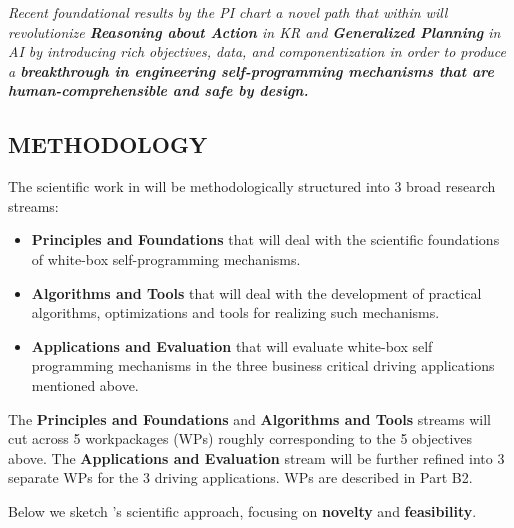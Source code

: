 \begin{framed}\it
Recent  foundational results by the PI chart a novel path that within \project will revolutionize \textbf{Reasoning about Action}  in KR and \textbf{Generalized Planning} in AI by introducing rich objectives, data, and componentization in order to produce a \textbf{breakthrough in engineering self-programming mechanisms that are human-comprehensible and safe by design.}
\end{framed}

\vspace{-3ex}
\subsection*{METHODOLOGY}
\vspace{-3ex}

The scientific work in \project will be methodologically structured into 3 broad research streams:
\begin{itemize}
\item \textbf{Principles and Foundations} that will deal with the
scientific foundations of white-box self-programming mechanisms. 

\item \textbf{Algorithms and Tools}  that will deal with the
development of practical algorithms, optimizations and tools for realizing
such mechanisms. 

\item \textbf{Applications and Evaluation}  that will evaluate white-box self programming mechanisms in the three business critical driving applications  mentioned above.
\end{itemize}
The \textbf{Principles and Foundations} and \textbf{Algorithms and Tools} streams
will cut across 5 workpackages (WPs) roughly corresponding to the 5
objectives above.  The \textbf{Applications and Evaluation} stream
will be further refined into 3 separate WPs for the 3 driving
applications. WPs are described in Part B2.

Below we sketch \project's scientific approach, focusing on \textbf{novelty} and \textbf{feasibility}. 






